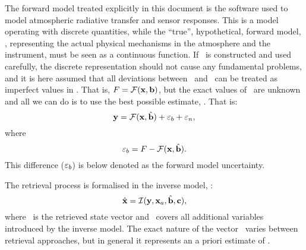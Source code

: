 The forward model treated explicitly in this document is the software used to
model atmospheric radiative transfer and sensor responses. This is a model
operating with discrete quantities, while the ``true'', hypothetical, forward
model, \trueFrwMdl, representing the actual physical mechanisms in the atmosphere
and the instrument, must be seen as a continuous function. If \FrwMdl\ is
constructed and used carefully, the discrete representation should not cause
any fundamental problems, and it is here assumed that all deviations between
\trueFrwMdl\ and \FrwMdl\ can be treated as imperfect values in \FrwMdlVct.
That is, $F=\mathcal{F}(\mathbf{x},\mathbf{b})$, but the exact values of
\FrwMdlVct\ are unknown and all we can do is to use the best possible estimate,
\FrwMdlVctHat. That is:
\begin{equation}
  \label{eq:fmodel2}
  \mathbf{y} = \mathcal{F}(\mathbf{x},\hat{\mathbf{b}}) + \varepsilon_b + \varepsilon_n,
\end{equation}
where 
\begin{equation}
  \label{eq:eps_b}
  \varepsilon_b = F - \mathcal{F}(\mathbf{x},\hat{\mathbf{b}}).
\end{equation}
This difference ($\varepsilon_b$) is below denoted as the forward model
uncertainty. 

The retrieval process is formalised in the inverse model, \InvMdl:
\begin{equation}
  \label{eq:imodel}
   \hat{\mathbf{x}} = \mathcal{I}(\mathbf{y},\mathbf{x}_{a},\hat{\mathbf{b}},\mathbf{c}),
\end{equation}
where \RtrVct\ is the retrieved state vector and \InvMdlVct\ covers all
additional variables introduced by the inverse model. The exact nature
of the vector \ varies between retrieval approaches, but in general it 
represents an a priori estimate of \SttVct.


